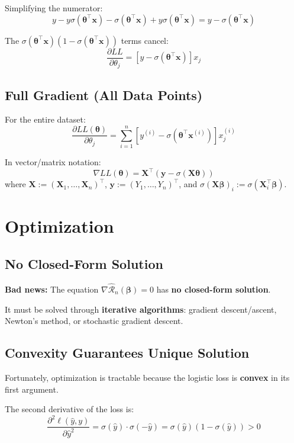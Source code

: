 \documentclass[main.tex]{subfiles}
\begin{document}
Simplifying the numerator:
$$y - y\sigma(\boldsymbol{\theta}^\top \mathbf{x}) - \sigma(\boldsymbol{\theta}^\top \mathbf{x}) + y\sigma(\boldsymbol{\theta}^\top \mathbf{x}) = y - \sigma(\boldsymbol{\theta}^\top \mathbf{x})$$

The $\sigma(\boldsymbol{\theta}^\top \mathbf{x})(1 - \sigma(\boldsymbol{\theta}^\top \mathbf{x}))$ terms cancel:
$$\boxed{\frac{\partial LL}{\partial \theta_j} = \left[ y - \sigma(\boldsymbol{\theta}^\top \mathbf{x}) \right] x_j}$$

\subsection{Full Gradient (All Data Points)}

For the entire dataset:
$$\boxed{\frac{\partial LL(\boldsymbol{\theta})}{\partial \theta_j} = \sum_{i=1}^{n} \left[ y^{(i)} - \sigma(\boldsymbol{\theta}^\top \mathbf{x}^{(i)}) \right] x_j^{(i)}}$$

In vector/matrix notation:
$$\nabla LL(\boldsymbol{\theta}) = \mathbf{X}^\top (\mathbf{y} - \sigma(\mathbf{X}\boldsymbol{\theta}))$$
where $\mathbf{X} := (\mathbf{X}_1, \ldots, \mathbf{X}_n)^\top$, $\mathbf{y} := (Y_1, \ldots, Y_n)^\top$, and $\sigma(\mathbf{X}\boldsymbol{\beta})_i := \sigma(\mathbf{X}_i^\top \boldsymbol{\beta})$.

\section{Optimization}

\subsection{No Closed-Form Solution}

\textbf{Bad news:} The equation $\nabla \hat{\mathcal{R}}_n(\boldsymbol{\beta}) = 0$ has \textbf{no closed-form solution}.

It must be solved through \textbf{iterative algorithms}: gradient descent/ascent, Newton's method, or stochastic gradient descent.

\subsection{Convexity Guarantees Unique Solution}

Fortunately, optimization is tractable because the logistic loss is \textbf{convex} in its first argument.

The second derivative of the loss is:
$$\frac{\partial^2 \ell(\hat{y}, y)}{\partial \hat{y}^2} = \sigma(\hat{y}) \cdot \sigma(-\hat{y}) = \sigma(\hat{y})(1 - \sigma(\hat{y})) > 0$$
\end{document}
